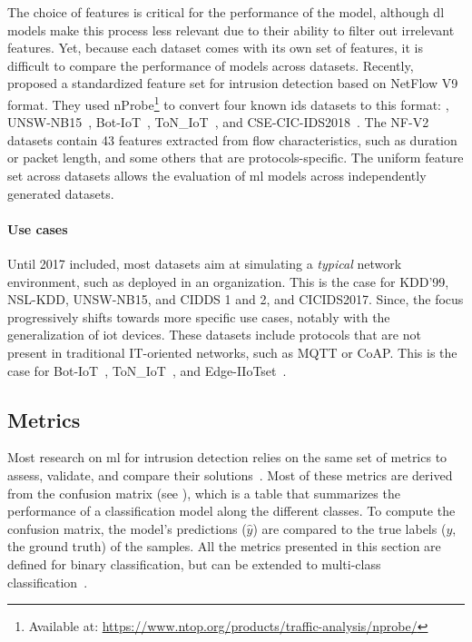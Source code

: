 The choice of features is critical for the performance of the model, although \gls{dl} models make this process less relevant due to their ability to filter out irrelevant features.
Yet, because each dataset comes with its own set of features, it is difficult to compare the performance of models across datasets.
Recently, \textcite{sarhan_StandardFeatureSet_2022} proposed a standardized feature set for intrusion detection based on NetFlow V9~\cite{rfc3954} format.
They used nProbe\footnote{Available at: \url{https://www.ntop.org/products/traffic-analysis/nprobe/}} to convert four known \gls{ids} datasets to this format: \ie, UNSW-NB15~\cite{moustafa_UNSWNB15comprehensivedata_2015}, Bot-IoT~\cite{koroniotis_developmentrealisticbotnet_2019}, ToN\_IoT~\cite{moustafa_newdistributedarchitecture_2021}, and CSE-CIC-IDS2018~\cite{sharafaldin_GeneratingNewIntrusion_2018}.
The NF-V2 datasets contain 43 features extracted from flow characteristics, such as duration or packet length, and some others that are protocols-specific.
The uniform feature set across datasets allows the evaluation of \gls{ml} models across independently generated datasets.

\paragraph{Use cases}

Until 2017 included, most datasets aim at simulating a \emph{typical} network environment, such as deployed in an organization.
This is the case for KDD'99, NSL-KDD, UNSW-NB15, and CIDDS 1 and 2, and CICIDS2017.
Since, the focus progressively shifts towards more specific use cases, notably with the generalization of \gls{iot} devices.
These datasets include protocols that are not present in traditional IT-oriented networks, such as MQTT or CoAP.
This is the case for Bot-IoT~\cite{koroniotis_developmentrealisticbotnet_2019}, ToN\_IoT~\cite{moustafa_newdistributedarchitecture_2021}, and Edge-IIoTset~\cite{ferrag_EdgeIIoTsetNewComprehensive_2022}.




\subsection{Metrics\label{sec:bg.ids.metrics}}

Most research on \gls{ml} for intrusion detection relies on the same set of metrics to assess, validate, and compare their solutions~\cite{chaabouni_NetworkIntrusionDetection_2019,faraj_Taxonomychallengesmachine_2020,buczak_SurveyDataMining_2016}.
Most of these metrics are derived from the confusion matrix (see ), which is a table that summarizes the performance of a classification model along the different classes.
To compute the confusion matrix, the model's predictions ($\hat{y}$) are compared to the true labels ($y$, the ground truth) of the samples.
All the metrics presented in this section are defined for binary classification, but can be extended to multi-class classification~\cite{buczak_SurveyDataMining_2016}.

